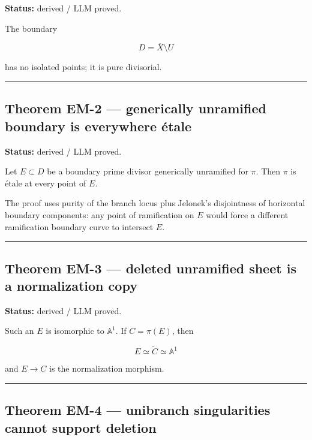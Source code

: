 \textbf{Status:} derived / LLM proved.

The boundary

\[
D=\overline X\setminus U
\]

has no isolated points; it is pure divisorial.

\begin{center}\rule{0.5\linewidth}{0.5pt}\end{center}

\subsection{Theorem EM-2 --- generically unramified boundary is
everywhere
étale}\label{theorem-em-2-generically-unramified-boundary-is-everywhere-uxe9tale}

\textbf{Status:} derived / LLM proved.

Let \(E\subset D\) be a boundary prime divisor generically unramified
for \(\pi\). Then \(\pi\) is étale at every point of \(E\).

The proof uses purity of the branch locus plus Jelonek's disjointness of
horizontal boundary components: any point of ramification on \(E\) would
force a different ramification boundary curve to intersect \(E\).

\begin{center}\rule{0.5\linewidth}{0.5pt}\end{center}

\subsection{Theorem EM-3 --- deleted unramified sheet is a normalization
copy}\label{theorem-em-3-deleted-unramified-sheet-is-a-normalization-copy}

\textbf{Status:} derived / LLM proved.

Such an \(E\) is isomorphic to \(\mathbb A^1\). If \(C=\pi(E)\), then

\[
E\simeq\widetilde C\simeq\mathbb A^1
\]

and \(E\to C\) is the normalization morphism.

\begin{center}\rule{0.5\linewidth}{0.5pt}\end{center}

\subsection{Theorem EM-4 --- unibranch singularities cannot support
deletion}\label{theorem-em-4-unibranch-singularities-cannot-support-deletion}

